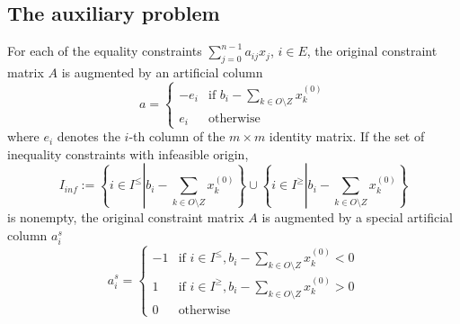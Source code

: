 \documentclass[a4paper]{article}
\begin{document}
\subsection{The auxiliary problem}
For each of the equality constraints $\sum_{j=0}^{n-1}a_{ij}x_{j}$, $i \in E$,
the original constraint matrix $A$ is augmented by an artificial column 
\begin{equation}
a= \left\{
\begin{array}{ll}
-e_{i}
&
\mbox{if $b_{i}-\sum_{k \in O \setminus Z}x_{k}^{(0)}$} \\
e_{i}
&
\mbox{otherwise}
\end{array}
\right.
\end{equation}
where $e_{i}$ denotes the $i$-th column of the $m \times m$ identity matrix. If the set of inequality constraints with infeasible origin, 
\begin{equation}
I_{inf}:=\left\{
  i \in I^{\leq}\left|\right. b_{i}-\sum_{k \in O \setminus Z}x_{k}^{(0)}
  \right\}
  \cup
  \left\{
    i \in I^{\geq} \left|\right. b_{i}-\sum_{k \in O \setminus Z}x_{k}^{(0)}
  \right\}
\end{equation}
is nonempty, the original constraint matrix $A$ is augmented by a special artificial column $a_{i}^{s}$
\begin{equation}
a_{i}^{s}= \left\{
\begin{array}{ll}
-1
&
\mbox{if $i \in I^{\leq}, b_{i}-\sum_{k \in O \setminus Z}x_{k}^{(0)}<0$} \\
1
&
\mbox{if $i \in I^{\geq}, b_{i}-\sum_{k \in O \setminus Z}x_{k}^{(0)}>0$} \\
0
&
\mbox{otherwise}
\end{array}
\right.
\end{equation}
\end{document}
